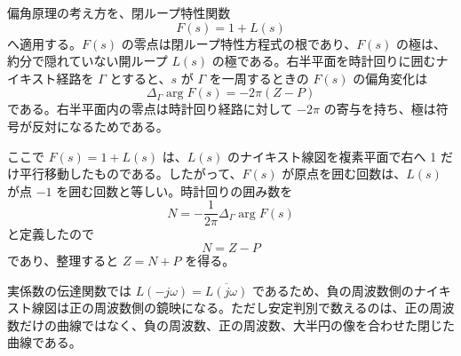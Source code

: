 \begin{derivation}
偏角原理の考え方を、閉ループ特性関数
\begin{equation}
  F(s)=1+L(s)
\end{equation}
へ適用する。$F(s)$ の零点は閉ループ特性方程式の根であり、$F(s)$ の極は、約分で隠れていない開ループ $L(s)$ の極である。右半平面を時計回りに囲むナイキスト経路を $\Gamma$ とすると、$s$ が $\Gamma$ を一周するときの $F(s)$ の偏角変化は
\begin{equation}
  \Delta_\Gamma \arg F(s)=-2\pi(Z-P)
\end{equation}
である。右半平面内の零点は時計回り経路に対して $-2\pi$ の寄与を持ち、極は符号が反対になるためである。

ここで $F(s)=1+L(s)$ は、$L(s)$ のナイキスト線図を複素平面で右へ 1 だけ平行移動したものである。したがって、$F(s)$ が原点を囲む回数は、$L(s)$ が点 $-1$ を囲む回数と等しい。時計回りの囲み数を
\begin{equation}
  N=-\frac{1}{2\pi}\Delta_\Gamma \arg F(s)
\end{equation}
と定義したので
\begin{equation}
  N=Z-P
\end{equation}
であり、整理すると $Z=N+P$ を得る。
\end{derivation}

実係数の伝達関数では $L(-j\omega)=\overline{L(j\omega)}$ であるため、負の周波数側のナイキスト線図は正の周波数側の鏡映になる。ただし安定判別で数えるのは、正の周波数だけの曲線ではなく、負の周波数、正の周波数、大半円の像を合わせた閉じた曲線である。

